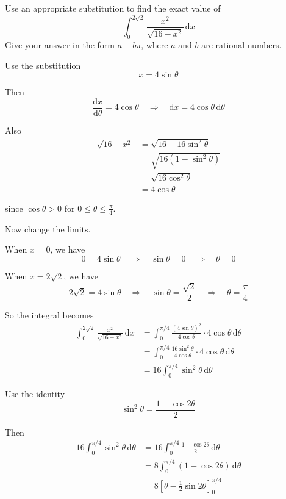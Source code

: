 \documentclass[leqno]{article}
\begin{document}
\begin{enumerate}[
  label=\textbf{\arabic*.},
  leftmargin=*,
  topsep=0pt,
  partopsep=0pt,
  parsep=0pt
]
\questionitem

Use an appropriate substitution to find the exact value of
\[
\int_0^{2\sqrt{2}} \frac{x^2}{\sqrt{16-x^2}}\,\mathrm{d}x
\]
Give your answer in the form $a+b\pi$, where $a$ and $b$ are rational numbers.  \\

\vspace*{10pt}

\begin{djsSolution}
Use the substitution
\[
x=4\sin\theta
\]

Then
\[
\frac{\mathrm{d}x}{\mathrm{d}\theta}=4\cos\theta
\quad\Longrightarrow\quad
\mathrm{d}x=4\cos\theta\,\mathrm{d}\theta
\]

Also
\begin{align*}
\sqrt{16-x^2}
&=\sqrt{16-16\sin^2\theta} \\
&=\sqrt{16(1-\sin^2\theta)} \\
&=\sqrt{16\cos^2\theta} \\
&=4\cos\theta
\end{align*}

since $\cos\theta>0$ for $0\le\theta\le\frac{\pi}{4}$.

Now change the limits.

When $x=0$, we have
\[
0=4\sin\theta\quad\Longrightarrow\quad\sin\theta=0\quad\Longrightarrow\quad\theta=0
\]

When $x=2\sqrt{2}$, we have
\[
2\sqrt{2}=4\sin\theta
\quad\Longrightarrow\quad
\sin\theta=\frac{\sqrt{2}}{2}
\quad\Longrightarrow\quad
\theta=\frac{\pi}{4}
\]

So the integral becomes
\begin{align*}
\int_0^{2\sqrt{2}} \frac{x^2}{\sqrt{16-x^2}}\,\mathrm{d}x
&=\int_0^{\pi/4} \frac{(4\sin\theta)^2}{4\cos\theta}\cdot 4\cos\theta\,\mathrm{d}\theta \\
&=\int_0^{\pi/4} \frac{16\sin^2\theta}{4\cos\theta}\cdot 4\cos\theta\,\mathrm{d}\theta \\
&=16\int_0^{\pi/4}\sin^2\theta\,\mathrm{d}\theta
\end{align*}

Use the identity
\[
\sin^2\theta=\frac{1-\cos2\theta}{2}
\]

Then
\begin{align*}
16\int_0^{\pi/4}\sin^2\theta\,\mathrm{d}\theta
&=16\int_0^{\pi/4}\frac{1-\cos2\theta}{2}\,\mathrm{d}\theta \\
&=8\int_0^{\pi/4}(1-\cos2\theta)\,\mathrm{d}\theta \\
&=8\left[\theta-\frac{1}{2}\sin2\theta\right]_0^{\pi/4}
\end{align*}


\end{djsSolution}
\end{enumerate}
\end{document}
